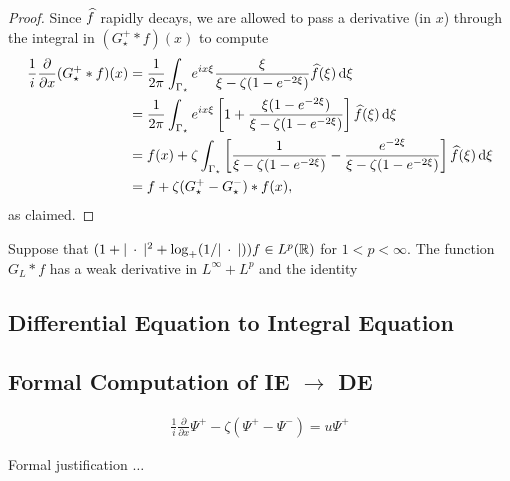 \documentclass[../dissertation.tex]{subfiles}
\begin{document}
\begin{proof}
	Since $\widehat{f}$ rapidly decays, we are allowed to pass a derivative (in $x$) through
	the integral in $(G_\star^+ * f)(x)$ to compute 
	\begin{align*}
		\frac{1}{i} \frac{\partial}{\partial x} (G_\star^+ * f)(x)
			&= \frac{1}{2\pi} \int_{\Gamma_\star} 
					e^{i x \xi} \frac{\xi}{\xi - \zeta(1-e^{-2\xi})} \widehat{f}(\xi)
				\, \mathrm{d}\xi \\
			&= \frac{1}{2\pi} \int_{\Gamma_\star} 
					e^{i x \xi} 
					\left[
						1+\frac{\xi(1-e^{-2\xi})}{\xi - \zeta(1-e^{-2\xi})}
					\right] 
					\widehat{f}(\xi)
				\, \mathrm{d}\xi \\
			&= f(x) 
				+ \zeta 
					\int_{\Gamma_\star}
						\left[
							\frac{1}{\xi-\zeta(1-e^{-2\xi})} - \frac{e^{-2\xi}}{\xi-\zeta(1-e^{-2\xi})}
						\right]
						\widehat{f}(\xi)
					\, \mathrm{d}\xi \\
			&= f + \zeta(G_\star^+ - G_\star^-)*f(x),
	\end{align*}
	as claimed. 
\end{proof}


\begin{lma}\label{lma:3.2_ie_extend}
	Suppose that $(1+|\kern 0.5ex \cdot \kern 0.5ex|^2 + \log_+(1/|\kern 0.5ex \cdot \kern 0.5ex|)) f\in L^p(\mathbb R)$ for $1< p < \infty$. 
	The function $G_L* f$ has a weak derivative in $L^\infty + L^p$ and the identity 
\end{lma}

\subsection{Differential Equation to Integral Equation}


\subsection{Formal Computation of IE $\to$ DE}
\begin{align}\label{eqn:3.02-SpecProb}
	\frac{1}{i} \frac{\partial}{\partial x} \Psi^+ - \zeta (\Psi^+ - \Psi^-) = u \Psi^+
\end{align}

{\color{red}Formal} justification $\ldots$
\end{document}
